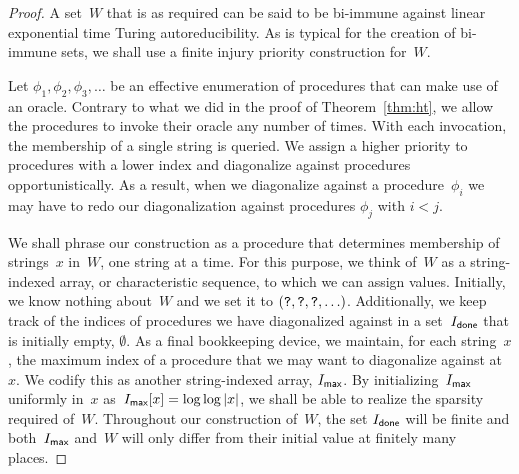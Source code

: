 \begin{proof}
  A set~$W$ that is as required can be said to be bi-immune against linear exponential time Turing autoreducibility.
  As is typical for the creation of bi-immune sets, we shall use a finite injury priority construction \parencite[see][Section~2.11]{downey2010algorithmic} for~$W$.

  Let $\phi_1, \phi_2, \phi_3, \ldots$ be an effective enumeration of procedures that can make use of an oracle.
  Contrary to what we did in the proof of Theorem~\ref{thm:ht}, we allow the procedures to invoke their oracle any number of times.
  With each invocation, the membership of a single string is queried.
  We assign a higher priority to procedures with a lower index and diagonalize against procedures opportunistically.
  As a result, when we diagonalize against a procedure~$\phi_i$ we may have to redo our diagonalization against procedures $\phi_j$ with $i < j$.

  We shall phrase our construction as a procedure that determines membership of strings~$x$ in~$W$, one string at a time.
  For this purpose, we think of~$W$ as a string-indexed array, or characteristic sequence, to which we can assign values.
  Initially, we know nothing about~$W$ and we set it to $(\textnormal{\texttt{?}}, \textnormal{\texttt{?}}, \textnormal{\texttt{?}}, \ldots)$.
  Additionally, we keep track of the indices of procedures we have diagonalized against in a set~$I_\textsf{done}$ that is initially empty, $\emptyset$.
  As a final bookkeeping device, we maintain, for each string~$x$, the maximum index of a procedure that we may want to diagonalize against at~$x$.
  We codify this as another string-indexed array, $I_\textsf{max}$.
  By initializing~$I_\textsf{max}$ uniformly in~$x$ as~$I_\textsf{max}[x] = \log \log {\lvert x\rvert}$, we shall be able to realize the sparsity required of~$W$.
  Throughout our construction of~$W$, the set $I_\textsf{done}$ will be finite and both~$I_\textsf{max}$ and~$W$ will only differ from their initial value at finitely many places.


\end{proof}
